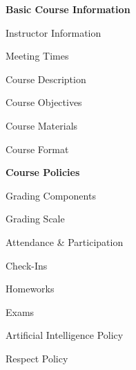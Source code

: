 \documentclass[11pt,letterpaper]{article}
\begin{document}
\mytitle

\vspace{-0.4cm}


\begin{minipage}[t]{0.45\textwidth} %
{\bfseries\color{scred} Basic Course Information} \dotfill \pageref{course_info} \par
\hspace{0.3cm} Instructor Information \dotfill \pageref{instr_info} \par
\hspace{0.3cm} Meeting Times \dotfill \pageref{meetings} \par
\hspace{0.3cm} Course Description \dotfill \pageref{course_desc} \par
\hspace{0.3cm} Course Objectives \dotfill \pageref{course_obj} \par
\hspace{0.3cm} Course Materials \dotfill \pageref{course_mat} \par
\hspace{0.3cm} Course Format \dotfill \pageref{course_format} \par
{\bfseries\color{scred} Course Policies} \dotfill \pageref{course_policies} \par
\hspace{0.3cm} Grading Components \dotfill \pageref{grade_comp} \par
\hspace{0.3cm} Grading Scale \dotfill \pageref{grade_scale} \par
\hspace{0.3cm} Attendance \& Participation \dotfill \pageref{attend} \par
\hspace{0.3cm} Check-Ins \dotfill \pageref{check} \par
\hspace{0.3cm} Homeworks \dotfill \pageref{hw} \par
\hspace{0.3cm} Exams \dotfill \pageref{exams} \par
\hspace{0.3cm} Artificial Intelligence Policy \dotfill \pageref{ai_policy} \par
\hspace{0.3cm} Respect Policy \dotfill \pageref{respect} \par

\end{minipage}
\end{document}

